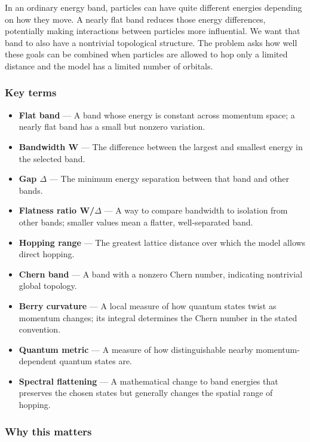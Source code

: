 \documentclass[
  11pt,
]{article}
\begin{document}
In an ordinary energy band, particles can have quite different energies
depending on how they move. A nearly flat band reduces those energy
differences, potentially making interactions between particles more
influential. We want that band to also have a nontrivial topological
structure. The problem asks how well these goals can be combined when
particles are allowed to hop only a limited distance and the model has a
limited number of orbitals.

\subsubsection{Key terms}

\begin{itemize}
\item
  \textbf{Flat band} --- A band whose energy is constant across momentum
  space; a nearly flat band has a small but nonzero variation.
\item
  \textbf{Bandwidth W} --- The difference between the largest and
  smallest energy in the selected band.
\item
  \textbf{Gap \ensuremath{\Delta}} --- The minimum energy separation
  between that band and other bands.
\item
  \textbf{Flatness ratio W/\ensuremath{\Delta}} --- A way to compare
  bandwidth to isolation from other bands; smaller values mean a
  flatter, well-separated band.
\item
  \textbf{Hopping range} --- The greatest lattice distance over which
  the model allows direct hopping.
\item
  \textbf{Chern band} --- A band with a nonzero Chern number, indicating
  nontrivial global topology.
\item
  \textbf{Berry curvature} --- A local measure of how quantum states
  twist as momentum changes; its integral determines the Chern number in
  the stated convention.
\item
  \textbf{Quantum metric} --- A measure of how distinguishable nearby
  momentum-dependent quantum states are.
\item
  \textbf{Spectral flattening} --- A mathematical change to band
  energies that preserves the chosen states but generally changes the
  spatial range of hopping.
\end{itemize}

\subsubsection{Why this matters}
\end{document}
